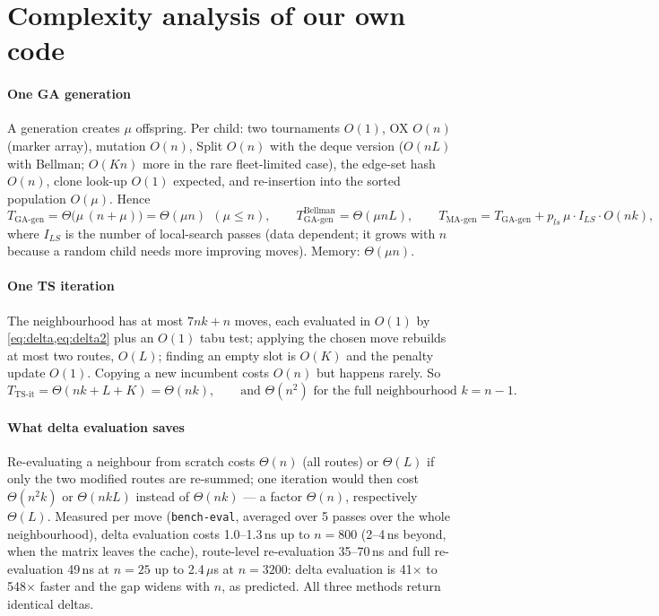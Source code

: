\section{Complexity analysis of our own code}\label{sec:complexity}
\paragraph{One GA generation} A generation creates $\mu$ offspring. Per child: two tournaments $O(1)$,
OX $O(n)$ (marker array), mutation $O(n)$, Split $O(n)$ with the deque version ($O(nL)$ with Bellman;
$O(Kn)$ more in the rare fleet-limited case), the edge-set hash $O(n)$, clone look-up $O(1)$ expected, and
re-insertion into the sorted population $O(\mu)$. Hence
\begin{equation}
T_{\text{GA-gen}}=\Theta\big(\mu\,(n+\mu)\big)=\Theta(\mu n)\ \ (\mu\le n),\qquad
T_{\text{GA-gen}}^{\text{Bellman}}=\Theta(\mu nL),\qquad
T_{\text{MA-gen}}=T_{\text{GA-gen}}+p_{ls}\,\mu\cdot I_{LS}\cdot O(nk),
\end{equation}
where $I_{LS}$ is the number of local-search passes (data dependent; it grows with $n$ because a random child
needs more improving moves). Memory: $\Theta(\mu n)$.

\paragraph{One TS iteration} The neighbourhood has at most $7nk+n$ moves, each evaluated in $O(1)$ by
\cref{eq:delta,eq:delta2} plus an $O(1)$ tabu test; applying the chosen move rebuilds at most two routes,
$O(L)$; finding an empty slot is $O(K)$ and the penalty update $O(1)$. Copying a new incumbent costs $O(n)$
but happens rarely. So
\begin{equation}
T_{\text{TS-it}}=\Theta(nk+L+K)=\Theta(nk),\qquad\text{and }\Theta(n^2)\text{ for the full neighbourhood }k=n-1 .
\end{equation}

\paragraph{What delta evaluation saves} Re-evaluating a neighbour from scratch costs $\Theta(n)$ (all
routes) or $\Theta(L)$ if only the two modified routes are re-summed; one iteration would then cost
$\Theta(n^2k)$ or $\Theta(nkL)$ instead of $\Theta(nk)$ --- a factor $\Theta(n)$, respectively $\Theta(L)$.
Measured per move (\texttt{bench-eval}, averaged over 5 passes over the whole neighbourhood), delta
evaluation costs 1.0--1.3\,ns up to $n=800$ (2--4\,ns beyond, when the matrix leaves the cache), route-level
re-evaluation 35--70\,ns and full re-evaluation 49\,ns at $n=25$ up to 2.4\,$\mu$s at $n=3200$: delta
evaluation is 41$\times$ to 548$\times$ faster and the gap widens with $n$, as predicted. All three methods
return identical deltas.

